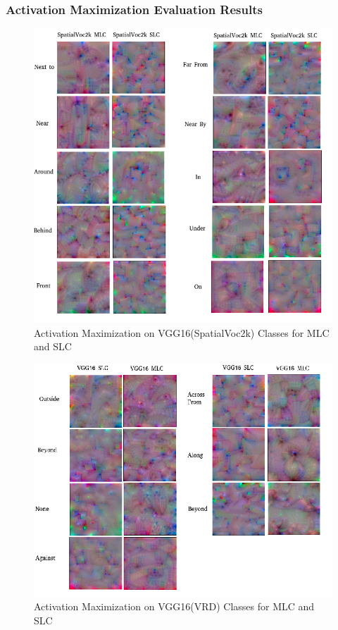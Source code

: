 \documentclass{csfyp}
\begin{document}
\subsubsection{Activation Maximization Evaluation Results}
\newpage
\begin{figure}[!htbp]
	\includegraphics[scale=0.60,center]{Spatial_act.pdf}
	\caption{Activation Maximization on VGG16(SpatialVoc2k) Classes for MLC and SLC}
\end{figure}
\begin{figure}[!htbp]
	\includegraphics[scale=0.60,center]{VGG16_Spatial2.pdf}
	\caption{Activation Maximization on VGG16(VRD) Classes for MLC and SLC}
\end{figure}
\newpage
\end{document}
